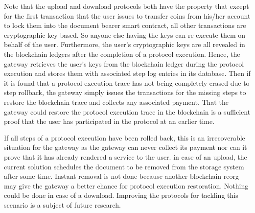 Note that the upload and download protocols both have the property that except for the first transaction that the user issues to transfer coins from his/her account to lock them into the document bearer smart contract, all other transactions are cryptographic key based. So anyone else having the keys can re-execute them on behalf of the user. Furthermore, the user's cryptographic keys are all revealed in the blockchain ledgers after the completion of a protocol execution. Hence, the gateway retrieves the user's keys from the blockchain ledger during the protocol execution and stores them with associated step log entries in its database. Then if it is found that a protocol execution trace has not being completely erased due to step rollback, the gateway simply issues the transactions for the missing steps to restore the blockchain trace and collects any associated payment. That the gateway could restore the protocol execution trace in the blockchain is a sufficient proof that the user has participated in the protocol at an earlier time.

If all steps of a protocol execution have been rolled back, this is an irrecoverable situation for the gateway as the gateway can never collect its payment nor can it prove that it has already rendered a service to the user. in case of an upload, the current solution schedules the document to be removed from the storage system after some time. Instant removal is not done because another blockchain reorg may give the gateway a better chance for protocol execution restoration. Nothing could be done in case of a download. Improving the protocols for tackling this scenario is a subject of future research.                                       